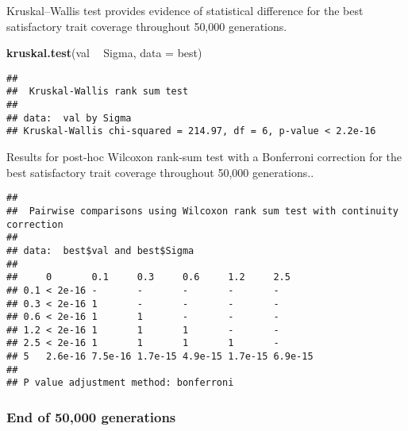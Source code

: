 \documentclass[]{book}
\newenvironment{Shaded}{\begin{snugshade}}{\end{snugshade}}
\newcommand{\DataTypeTok}[1]{\textcolor[rgb]{0.13,0.29,0.53}{#1}}
\newcommand{\KeywordTok}[1]{\textcolor[rgb]{0.13,0.29,0.53}{\textbf{#1}}}
\newcommand{\NormalTok}[1]{#1}
\newcommand{\OperatorTok}[1]{\textcolor[rgb]{0.81,0.36,0.00}{\textbf{#1}}}
\newcommand{\OtherTok}[1]{\textcolor[rgb]{0.56,0.35,0.01}{#1}}
\newcommand{\StringTok}[1]{\textcolor[rgb]{0.31,0.60,0.02}{#1}}
\begin{document}
Kruskal--Wallis test provides evidence of statistical difference for the best satisfactory trait coverage throughout 50,000 generations.

\begin{Shaded}
\begin{Highlighting}[]
\KeywordTok{kruskal.test}\NormalTok{(val }\OperatorTok{~}\StringTok{ }\NormalTok{Sigma, }\DataTypeTok{data =}\NormalTok{ best)}
\end{Highlighting}
\end{Shaded}

\begin{verbatim}
## 
##  Kruskal-Wallis rank sum test
## 
## data:  val by Sigma
## Kruskal-Wallis chi-squared = 214.97, df = 6, p-value < 2.2e-16
\end{verbatim}

Results for post-hoc Wilcoxon rank-sum test with a Bonferroni correction for the best satisfactory trait coverage throughout 50,000 generations..

\begin{Shaded}
\end{Shaded}

\begin{verbatim}
## 
##  Pairwise comparisons using Wilcoxon rank sum test with continuity correction 
## 
## data:  best$val and best$Sigma 
## 
##     0       0.1     0.3     0.6     1.2     2.5    
## 0.1 < 2e-16 -       -       -       -       -      
## 0.3 < 2e-16 1       -       -       -       -      
## 0.6 < 2e-16 1       1       -       -       -      
## 1.2 < 2e-16 1       1       1       -       -      
## 2.5 < 2e-16 1       1       1       1       -      
## 5   2.6e-16 7.5e-16 1.7e-15 4.9e-15 1.7e-15 6.9e-15
## 
## P value adjustment method: bonferroni
\end{verbatim}

\hypertarget{end-of-50000-generations-32}{%
\subsubsection{End of 50,000 generations}\label{end-of-50000-generations-32}}
\end{document}
